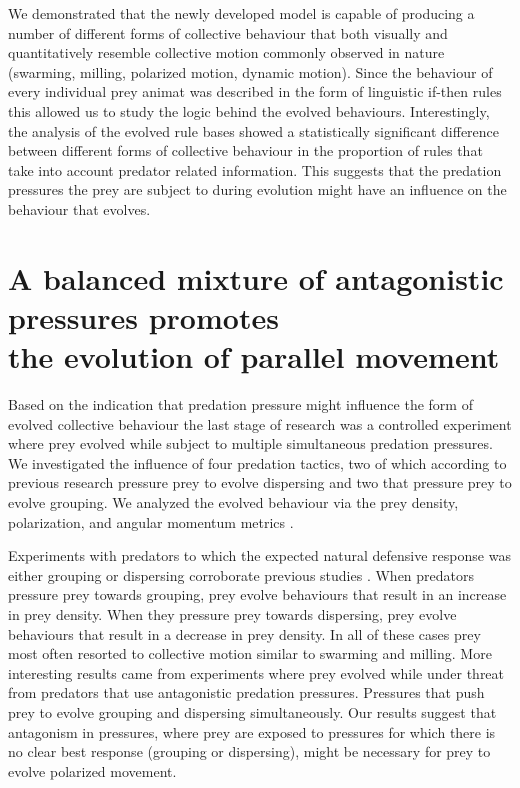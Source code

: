 We demonstrated that the newly developed model is capable of producing a number of different forms of collective behaviour that both visually and quantitatively \cite{couzin2002collective,vicsek2012collective,tunstrom2013collective} resemble collective motion commonly observed in nature (swarming, milling, polarized motion, dynamic motion). Since the behaviour of every individual prey animat was described in the form of linguistic if-then rules this allowed us to study the logic behind the evolved behaviours. Interestingly, the analysis of the evolved rule bases showed a statistically significant difference between different forms of collective behaviour in the proportion of rules that take into account predator related information. This suggests that the predation pressures the prey are subject to during evolution might have an influence on the behaviour that evolves.

\section{A balanced mixture of antagonistic pressures promotes\\ the evolution of parallel movement}

Based on the indication that predation pressure might influence the form of evolved collective behaviour the last stage of research was a controlled experiment where prey evolved while subject to multiple simultaneous predation pressures. We investigated the influence of four predation tactics, two of which according to previous research pressure prey to evolve dispersing and two that pressure prey to evolve grouping. We analyzed the evolved behaviour via the prey density, polarization, and angular momentum metrics \cite{couzin2002collective,olson2016evolution,tunstrom2013collective}. 

Experiments with predators to which the expected natural defensive response was either grouping or dispersing corroborate previous studies \cite{biswas2014causes,olson2013predator,olson2016evolution,wood2007evolving}. When predators pressure prey towards grouping, prey evolve behaviours that result in an increase in prey density. When they pressure prey towards dispersing, prey evolve behaviours that result in a decrease in prey density. In all of these cases prey most often resorted to collective motion similar to swarming and milling. More interesting results came from experiments where prey evolved while under threat from predators that use antagonistic predation pressures. Pressures that push prey to evolve grouping and dispersing simultaneously. Our results suggest that antagonism in pressures, where prey are exposed to pressures for which there is no clear best response (grouping or dispersing), might be necessary for prey to evolve polarized movement.

